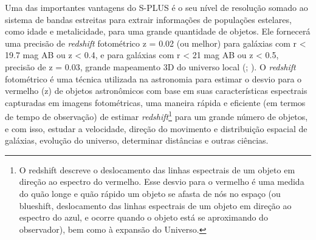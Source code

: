 Uma das importantes vantagens do S-PLUS é o seu nível de resolução somado ao sistema de bandas estreitas para extrair informações de populações estelares, como idade e metalicidade, para uma grande quantidade de objetos. Ele fornecerá uma precisão de \emph{redshift} fotométrico z = 0.02 (ou melhor) para galáxias com r < 19.7 mag AB ou z < 0.4, e para galáxias com r < 21 mag AB ou z < 0.5, precisão de z = 0.03, grande mapeamento 3D do universo local (; ). O \emph{redshift} fotométrico é uma técnica utilizada na astronomia para estimar o desvio para o vermelho (z) de objetos astronômicos com base em suas características espectrais capturadas em imagens fotométricas, uma maneira rápida e eficiente (em termos de tempo de observação) de estimar \emph{redshift}\footnote[9]{O redshift descreve o deslocamento das linhas espectrais de um objeto em direção ao espectro do vermelho. Esse desvio para o vermelho é uma medida do quão longe e quão rápido um objeto se afasta de nós no espaço (ou blueshift, deslocamento das linhas espectrais de um objeto em direção ao espectro do azul, e ocorre quando o objeto está se aproximando do observador), bem como à expansão do Universo.} para um grande número de objetos, e com isso, estudar a velocidade, direção do movimento e distribuição espacial de galáxias, evolução do universo, determinar distâncias e outras ciências. 

